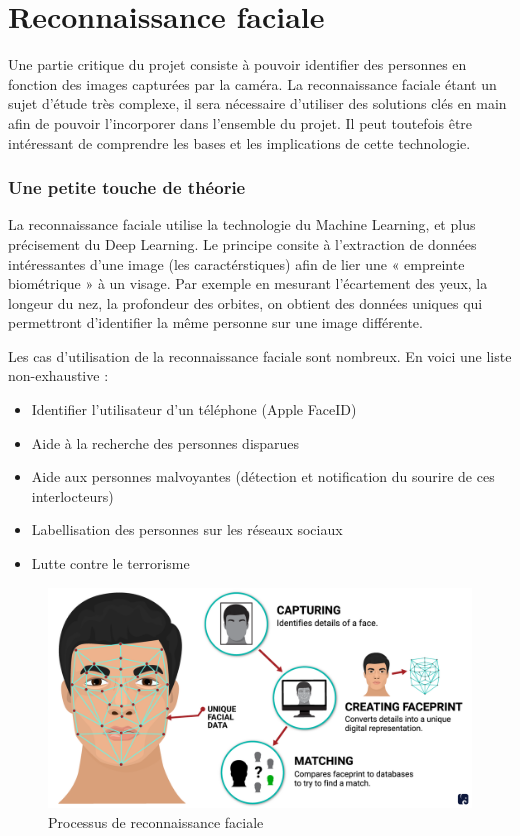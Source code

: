 \chapter{Reconnaissance faciale}
\label{ch:reco_faciale}

Une partie critique du projet consiste à pouvoir identifier des personnes en fonction des images capturées par la
caméra. La reconnaissance faciale étant un sujet d’étude très complexe, il sera nécessaire d’utiliser des solutions
clés en main afin de pouvoir l’incorporer dans l’ensemble du projet. Il peut toutefois être intéressant de
comprendre les bases et les implications de cette technologie.

\subsection{Une petite touche de théorie}
La reconnaissance faciale utilise la technologie du Machine Learning, et plus précisement du Deep Learning.
Le principe consite à l’extraction de données intéressantes d’une image (les caractérstiques) afin de lier une
« empreinte biométrique » à un visage. Par exemple en mesurant l’écartement des yeux, la longeur du nez, la
profondeur des orbites, on obtient des données uniques qui permettront d’identifier la même personne sur une
image différente.

Les cas d’utilisation de la reconnaissance faciale sont nombreux.
En voici une liste non-exhaustive :
\begin{itemize}
\item Identifier l’utilisateur d’un téléphone (Apple FaceID)
\item Aide à la recherche des personnes disparues
\item Aide aux personnes malvoyantes (détection et notification du sourire de ces interlocteurs)
\item Labellisation des personnes sur les réseaux sociaux
\item Lutte contre le terrorisme
\end{itemize}

\begin{figure}[H]
	\centering
	\includegraphics[width=12cm]{images/proto-5.png}
	\caption{Processus de reconnaissance faciale}
	\label{fig:arealytics}
\end{figure}

